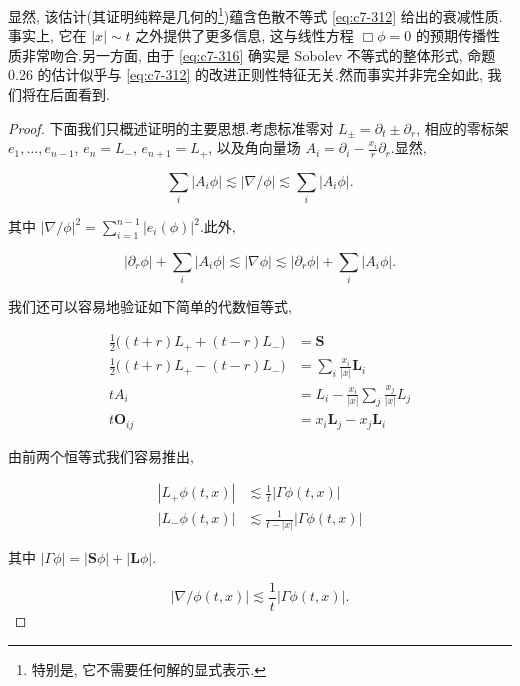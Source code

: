 \begin{remark}\label{rem:c7-0.27}
显然, 该估计(其证明纯粹是几何的\footnote{特别是, 它不需要任何解的显式表示.})蕴含色散不等式 \eqref{eq:c7-312} 给出的衰减性质.事实上, 它在 $|x|\sim t$ 之外提供了更多信息, 这与线性方程 $\Box\phi = 0$ 的预期传播性质非常吻合.另一方面, 由于 \eqref{eq:c7-316} 确实是 Sobolev 不等式的整体形式, 命题 0.26 的估计似乎与 \eqref{eq:c7-312} 的改进正则性特征无关.然而事实并非完全如此, 我们将在后面看到.
\end{remark}
\begin{proof}
下面我们只概述证明的主要思想.考虑标准零对 $L_{\pm} = \partial_t\pm\partial_r$, 相应的零标架 $e_1, \ldots, e_{n-1}$, $e_n = L_-$, $e_{n+1} = L_+$, 以及角向量场 $A_i = \partial_i - \frac{x_i}{r}\partial_r$.显然,

\[
\sum_i|A_i\phi| \lesssim |\nabla\!\!\!/\phi| \lesssim \sum_i|A_i\phi|.
\]

其中 $|\nabla\!\!\!/\phi|^2 = \sum_{i=1}^{n-1}|e_i(\phi)|^2$.此外,

\[
|\partial_r\phi| + \sum_i|A_i\phi| \lesssim |\nabla\phi| \lesssim |\partial_r\phi| + \sum_i|A_i\phi|.
\]

我们还可以容易地验证如下简单的代数恒等式,

\[
\begin{aligned}
\frac{1}{2}\big((t+r)L_+ + (t-r)L_-\big) &= \mathbf{S} \\
\frac{1}{2}\big((t+r)L_+ - (t-r)L_-\big) &= \sum_i\frac{x_i}{|x|}\mathbf{L}_i \\
tA_i &= L_i - \frac{x_i}{|x|}\sum_j\frac{x_j}{|x|}L_j \\
t\mathbf{O}_{ij} &= x_i\mathbf{L}_j - x_j\mathbf{L}_i
\end{aligned}
\]

由前两个恒等式我们容易推出,

\begin{equation}
\begin{aligned}
|L_+\phi(t, x)| &\lesssim \frac{1}{t}|\Gamma\phi(t, x)| \\
|L_-\phi(t, x)| &\lesssim \frac{1}{t-|x|}|\Gamma\phi(t, x)|
\end{aligned}\label{eq:c7-318}
\end{equation}

其中 $|\Gamma\phi| = |\mathbf{S}\phi| + |\mathbf{L}\phi|$.

\begin{equation}
|\nabla\!\!\!/\phi(t, x)| \lesssim \frac{1}{t}|\Gamma\phi(t, x)|.\label{eq:c7-319}
\end{equation}


\end{proof}

